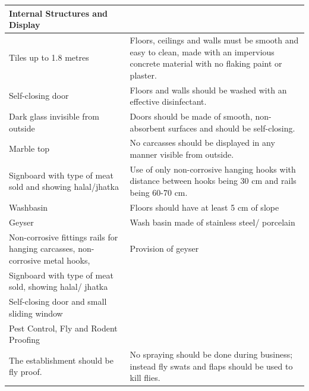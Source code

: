 \documentclass[a4paper, 12pt]{article}
\newcommand\tabitem{\makebox[1em][r]{\textbullet~}}
\begin{document}
\begin{longtable}{>{\raggedright}p{6.5cm}>{\raggedright\arraybackslash}p{8.5cm}}
    Internal Structures and Display 	&	\\
    \midrule
   \tabitem  Tiles up to 1.8 metres	& 	\tabitem Floors, ceilings and walls must be smooth and easy to clean, made with an impervious concrete material with no flaking paint or plaster.\\
\newline{} \tabitem Self-closing door	&	\newline{} \tabitem Floors and walls should be washed with an effective disinfectant.\\
\newline{} \tabitem Dark glass invisible from outside	&	 \newline{} \tabitem Doors should be made of smooth, non-absorbent surfaces and should be self-closing.\\
\newline{} \tabitem Marble top 	&	 \newline{}\tabitem No carcasses should be displayed in any manner visible from outside.\\
\newline{} \tabitem Signboard with type of meat sold and showing halal/jhatka 	&	 \newline{} \tabitem Use of only non-corrosive hanging hooks with distance between hooks being 30 cm and rails being 60-70 cm.\\
\newline{} \tabitem Washbasin 	&	 \newline{} \tabitem Floors should have at least 5 cm of slope\\
\newline{} \tabitem Geyser	&	 \newline{} \tabitem Wash basin made of stainless steel/ porcelain\\
\newline{} \tabitem Non-corrosive fittings rails for hanging carcasses, non-corrosive metal hooks,	&	\newline{} \tabitem Provision of geyser \\
\newline{} \tabitem Signboard with type of meat sold, showing halal/ jhatka	&		\\
\newline{} \tabitem Self-closing door and small sliding window	&	\\
    \midrule
    Pest Control, Fly and Rodent Proofing 	&	\\
    \midrule
	\tabitem The establishment should be fly proof. & \tabitem No spraying should be done during business; instead fly swats and flaps should be used to kill flies.\\

\end{longtable}
\end{document}
